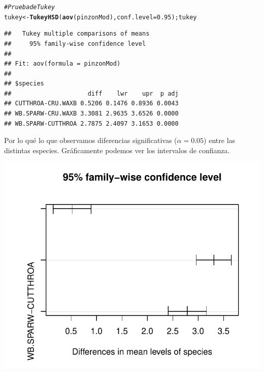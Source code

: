 \documentclass[a4paper]{scrartcl}\usepackage[]{graphicx}\usepackage[]{color}
\makeatletter
\def\maxwidth{ %
  \ifdim\Gin@nat@width>\linewidth
    \linewidth
  \else
    \Gin@nat@width
  \fi
}
\newcommand{\hlnum}[1]{\textcolor[rgb]{0.686,0.059,0.569}{#1}}%
\newcommand{\hlcom}[1]{\textcolor[rgb]{0.678,0.584,0.686}{\textit{#1}}}%
\newcommand{\hlstd}[1]{\textcolor[rgb]{0.345,0.345,0.345}{#1}}%
\newcommand{\hlkwb}[1]{\textcolor[rgb]{0.69,0.353,0.396}{#1}}%
\newcommand{\hlkwc}[1]{\textcolor[rgb]{0.333,0.667,0.333}{#1}}%
\newcommand{\hlkwd}[1]{\textcolor[rgb]{0.737,0.353,0.396}{\textbf{#1}}}%
\newenvironment{kframe}{%
 \def\at@end@of@kframe{}%
 \ifinner\ifhmode%
  \def\at@end@of@kframe{\end{minipage}}%
  \begin{minipage}{\columnwidth}%
 \fi\fi%
 \def\FrameCommand##1{\hskip\@totalleftmargin \hskip-\fboxsep
 \colorbox{shadecolor}{##1}\hskip-\fboxsep
     \hskip-\linewidth \hskip-\@totalleftmargin \hskip\columnwidth}%
 \MakeFramed {\advance\hsize-\width
   \@totalleftmargin\z@ \linewidth\hsize
   \@setminipage}}%
 {\par\unskip\endMakeFramed%
 \at@end@of@kframe}
\newenvironment{knitrout}{}{} %
\makeatother
\begin{document}
\begin{itemize}
\begin{itemize}
\begin{itemize}
\begin{itemize}
\begin{knitrout}
\color{fgcolor}\begin{kframe}
\begin{alltt}
\hlcom{# Prueba de Tukey}
\hlstd{tukey} \hlkwb{<-} \hlkwd{TukeyHSD}\hlstd{(}\hlkwd{aov}\hlstd{(pinzonMod),} \hlkwc{conf.level} \hlstd{=} \hlnum{0.95}\hlstd{); tukey}
\end{alltt}
\begin{verbatim}
##   Tukey multiple comparisons of means
##     95% family-wise confidence level
## 
## Fit: aov(formula = pinzonMod)
## 
## $species
##                     diff    lwr    upr  p adj
## CUTTHROA-CRU.WAXB 0.5206 0.1476 0.8936 0.0043
## WB.SPARW-CRU.WAXB 3.3081 2.9635 3.6526 0.0000
## WB.SPARW-CUTTHROA 2.7875 2.4097 3.1653 0.0000
\end{verbatim}
\end{kframe}
\end{knitrout}

\noindent Por lo qué lo que observamos diferencias significativas ($\alpha = 0.05$) entre las distintas especies. Gráficamente podemos ver los intervalos de confianza.

\begin{knitrout}
\color{fgcolor}

{\centering \includegraphics[width=\maxwidth]{figure/unnamed-chunk-27} 

}




\end{knitrout}
\end{itemize}
\end{itemize}
\end{itemize}
\end{itemize}
\end{document}
